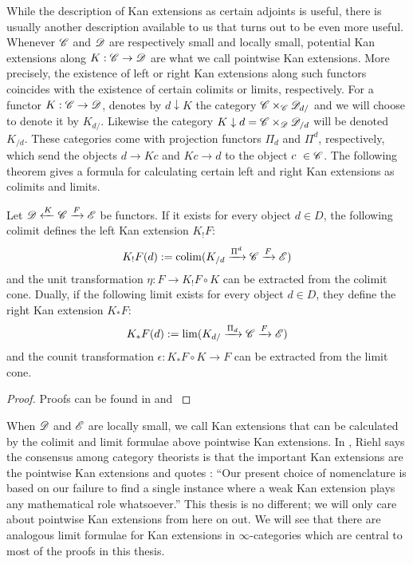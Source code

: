 \documentclass[../../thesis.tex]{subfiles}
\begin{document}
While the description of Kan extensions as certain adjoints is useful, there is usually another description available to us that turns out to be even more useful.
Whenever $\mathscr{C}$ and $\mathscr{D}$ are respectively small and locally small, potential Kan extensions along $K: \mathscr{C} \to \mathscr{D}$ are what we call pointwise Kan extensions.
More precisely, the existence of left or right Kan extensions along such functors coincides with the existence of certain colimits or limits, respectively.
For a functor $K:\mathscr{C} \to \mathscr{D}$, \cite{MacLane} denotes by $d \downarrow K$ the category $\mathscr{C} \times_{\mathscr{C}}\mathscr{D}_{d/}$ and we will choose to denote it by $K_{d/}$.
Likewise the category $K \downarrow d = \mathscr{C} \times_{\mathscr{D}}\mathscr{D}_{/d}$ will be denoted $K_{/d}$.
These categories come with projection functors $\Pi_d$ and $\Pi^d$, respectively, which send the objects $d\to Kc$ and $Kc \to d$ to the object $c \in \C$.
The following theorem gives a formula for calculating certain left and right Kan extensions as colimits and limits.
\begin{theorem}\label{ptwiseKan}
    Let $\mathscr{D} \xleftarrow{K} \mathscr{C} \xrightarrow{F} \mathscr{E}$ be functors.
    If it exists for every object $d\in D$, the following colimit defines the left Kan extension $K_!F$:
    \[
        K_!F(d) : = \operatorname{colim}(K_{/d} \xrightarrow{\Pi^d}\mathscr{C}\xrightarrow{F}\mathscr{E})
    \]
    and the unit transformation $\eta: F \to K_!F\circ K$ can be extracted from the colimit cone.
    Dually, if the following limit exists for every object $d\in D$, they define the right Kan extension $K_*F$:
    \[
        K_*F(d) : = \lim(K_{d/} \xrightarrow{\Pi_d}\mathscr{C} \xrightarrow{F} \mathscr{E})
    \]
    and the counit transformation $\epsilon: K_*F\circ K \to F$ can be extracted from the limit cone.
\end{theorem}
\begin{proof}
    Proofs can be found in \cite[Theorem 6.2.1.]{CatContext} and \cite[Theorem X.3.1.]{MacLane}
\end{proof}
When $\mathscr{D}$ and $\mathscr{E}$ are locally small, we call Kan extensions that can be calculated by the colimit and limit formulae above pointwise Kan extensions.
In \cite{CatContext}, Riehl says the consensus among category theorists is that the important Kan extensions are the pointwise Kan extensions and quotes \cite[§4]{Kelly}:
``Our present choice of nomenclature is based on our failure to find a single instance where a weak Kan extension plays any mathematical role whatsoever.''
This thesis is no different; we will only care about pointwise Kan extensions from here on out.
We will see that there are analogous limit formulae for Kan extensions in $\infty$-categories which are central to most of the proofs in this thesis.
\end{document}
